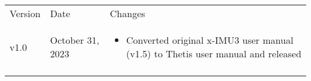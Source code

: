 
\begingroup
    \def\arraystretch{1.5}
    \begin{longtable}{| >{\centering}p{} | p{} | >{\raggedright\arraybackslash}p{} |}
        \arrayrulecolor{gray!50}\hline
        Version & Date & Changes\\
        \arrayrulecolor{gray!50}\hline
        v1.0 & October 31, 2023 &
        \begin{itemize}
            \item Converted original x-IMU3 user manual (v1.5) to Thetis user manual and released
        \end{itemize}\\
        \arrayrulecolor{gray!50}\hline
    \end{longtable}
\endgroup
